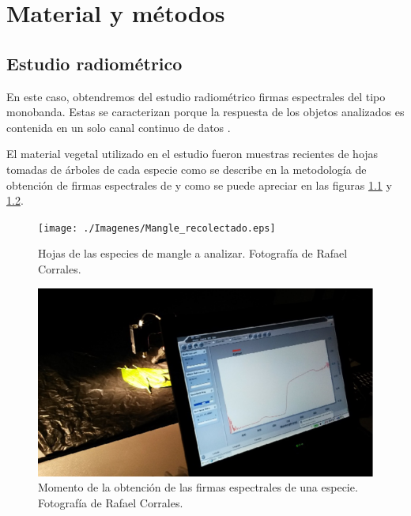 


\chapter{Material y métodos}
\label{cap:materialymetodos}

\section{Estudio radiométrico}
En este caso, obtendremos del estudio radiométrico firmas espectrales del tipo monobanda. Estas se caracterizan porque la respuesta de los objetos analizados es contenida en un solo canal continuo de datos \citep{andinofase1}.\Sep

El material vegetal utilizado en el estudio fueron muestras recientes de hojas tomadas de árboles de cada especie como se describe en la metodología de obtención de firmas espectrales de \cite{andinofase2} y como se puede apreciar en las figuras \ref{fig:mangle_recolectado} y \ref{fig:curva_espectral}.

\begin{figure}
	\centering
	\texttt{[image: ./Imagenes/Mangle\_recolectado.eps]}
	\caption[Mangle recolectado]{Hojas de las especies de mangle a analizar. Fotografía de Rafael Corrales.}
	\label{fig:mangle_recolectado}
\end{figure}

\begin{figure}
	\centering
	\includegraphics[width=0.8\linewidth]{./Imagenes/Curva_espectral.eps}
	\caption[Obtención de firmas]{Momento de la obtención de las firmas espectrales de una especie. Fotografía de Rafael Corrales.}
	\label{fig:curva_espectral}
\end{figure}

